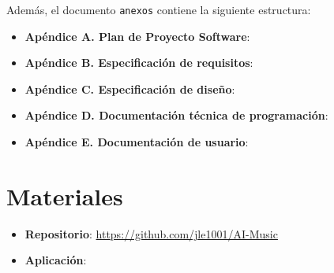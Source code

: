 Además, el documento \texttt{anexos} contiene la siguiente estructura:

\begin{itemize}
\tightlist
\item \textbf{Apéndice A. Plan de Proyecto Software}:
\item \textbf{Apéndice B. Especificación de requisitos}:
\item \textbf{Apéndice C. Especificación de diseño}:
\item \textbf{Apéndice D. Documentación técnica de programación}:
\item \textbf{Apéndice E. Documentación de usuario}:
\end{itemize}

\section{Materiales}

\begin{itemize}
\tightlist
\item \textbf{Repositorio}: \url{https://github.com/jle1001/AI-Music}
\item \textbf{Aplicación}:
\end{itemize}